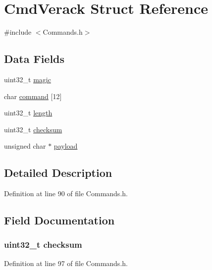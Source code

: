 \hypertarget{struct_cmd_verack}{
\section{CmdVerack Struct Reference}
\label{struct_cmd_verack}
}


{\ttfamily \#include $<$Commands.h$>$}

\subsection*{Data Fields}
\begin{DoxyCompactItemize}
\item 
uint32\_\-t \hyperlink{struct_cmd_verack_a57f54349f4fd1cbbb52058812e146af2}{magic}
\item 
char \hyperlink{struct_cmd_verack_a5b9e40150e73a908b8815ab282e5a4d3}{command} \mbox{[}12\mbox{]}
\item 
uint32\_\-t \hyperlink{struct_cmd_verack_aebb70c2aab3407a9f05334c47131a43b}{length}
\item 
uint32\_\-t \hyperlink{struct_cmd_verack_aa482bc33779a87f57ab8efc2c1680c48}{checksum}
\item 
unsigned char $\ast$ \hyperlink{struct_cmd_verack_a330f1bb25881c43b17265cdc48d8b5a2}{payload}
\end{DoxyCompactItemize}


\subsection{Detailed Description}


Definition at line 90 of file Commands.h.



\subsection{Field Documentation}
\hypertarget{struct_cmd_verack_aa482bc33779a87f57ab8efc2c1680c48}{
\subsubsection[{checksum}]{\setlength{\rightskip}{0pt plus 5cm}uint32\_\-t {\bf checksum}}}
\label{struct_cmd_verack_aa482bc33779a87f57ab8efc2c1680c48}


Definition at line 97 of file Commands.h.

